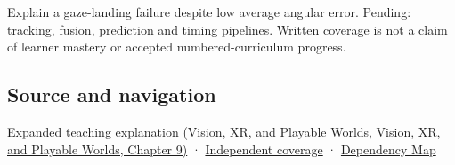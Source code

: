 Explain a gaze-landing failure despite low average angular error. Pending: tracking, fusion, prediction and timing pipelines. Written coverage is not a claim of learner mastery or accepted numbered-curriculum progress.

\subsection{Source and navigation}\label{appendix-a6f2c4fe1996-source-and-navigation}

\href{../07-Vision-XR-and-Playable-Worlds/main.pdf\#nameddest=04-visual-computing-ii-ch042-a-gaze-sample-needs-a-time-as-well-as-a-direction}{Expanded teaching explanation (Vision, XR, and Playable Worlds, Vision, XR, and Playable Worlds, Chapter 9)} · \hyperref[appendix-fd090d982a15-xr01---independent-seeing-and-representation-source]{Independent coverage} · \hyperref[appendix-4ad47bdd269a]{Dependency Map}

